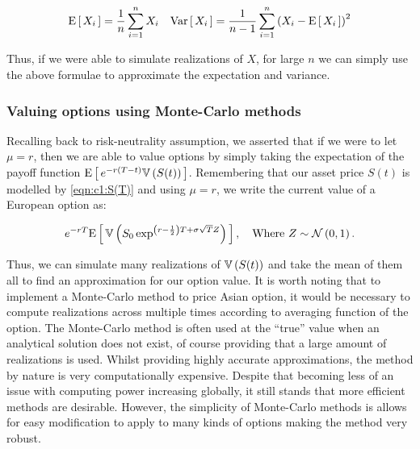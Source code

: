 \begin{align*}
    \text{E}\left[\,X_i\,\right] = \frac{1}{n}\sum_{i=1}^nX_i && \text{Var}\left[\,X_i\,\right] = \frac{1}{n-1}\sum_{i=1}^n\left(X_i-\text{E}\left[\,X_i\,\right]\right)^2
\end{align*}

Thus, if we were able to simulate realizations of \(X\), for large \(n\) we can simply use the above formulae to approximate the expectation and variance.

\subsubsection{Valuing options using Monte-Carlo methods}

Recalling back to risk-neutrality assumption, we asserted that if we were to let \(\mu = r\), then we are able to value options by simply taking the expectation of the payoff function \(\text{E}\left[\,e^{-r(T-t)}\mathbb{V}\left(S(t)\right)\,\right]\). Remembering that our asset price \(S(t)\) is modelled by \autoref{eqn:c1:S(T)} and using \(\mu = r\), we write the current value of a European option as:

\begin{equation*}
    e^{-rT}\text{E}\left[\,\mathbb{V}\left(S_0\exp^{\left(r-\frac{1}{2}\right)T+\sigma\sqrt{T}Z}\right)\,\right],\quad\text{Where \(Z\sim\mathcal{N}\left(0,1\right). \)}
\end{equation*}

Thus, we can simulate many realizations of \(\mathbb{V}\left(S(t)\right)\) and take the mean of them all to find an approximation for our option value. It is worth noting that to implement a Monte-Carlo method to price Asian option, it would be necessary to compute realizations across multiple times according to averaging function of the option.
\nline{}
The Monte-Carlo method is often used at the ``true'' value  when an analytical solution does not exist, of course providing that a large amount of realizations is used. Whilst providing highly accurate approximations, the method by nature is very computationally expensive. Despite that becoming less of an issue with computing power increasing globally, it still stands that more efficient methods are desirable. However, the simplicity of Monte-Carlo methods is allows for easy modification to apply to many kinds of options making the method very robust.
